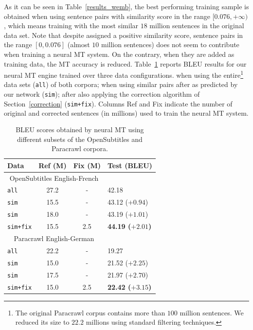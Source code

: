 \documentclass[11pt,a4paper]{article}
\begin{document}
As it can be seen in Table~\ref{results_wemb}, the best performing
training sample is obtained when using sentence pairs with similarity
score in the range $[0.076, +\infty)$, which means training with the 
most similar $18$ million sentences in the original data set. 
Note that despite assigned a positive similarity score, sentence pairs in the range $[0, 0.076]$ (almost $10$ million sentences) does not seem to contribute when training a neural MT system. 
On the contrary, when they are added as training data, the MT accuracy is reduced.
Table~\ref{results} reports BLEU results for our neural MT engine trained over three data configurations.
when using the entire\footnote{The original Paracrawl corpus contains more than $100$ million sentences. We reduced its size to $22.2$ millions using standard filtering techniques.} data sets (\texttt{all}) of both corpora; 
when using similar pairs after as predicted by our network (\texttt{sim}); 
after also applying the correction algorithm of Section~\ref{correction} (\texttt{sim+fix}).
Columns Ref and Fix indicate the number of original and corrected
sentences (in millions) used to train the neural MT system.

\begin{table}[h!]
\small
\center
\begin{tabular}{lccl}
\hline
\bf Data & \bf Ref (M) & \bf Fix (M) & \bf Test (BLEU) \\ %
\hline
\multicolumn{3}{c}{\scriptsize{OpenSubtitles English-French}} \\
\texttt{all}                   & 27.2 & - & 42.18 \\
\texttt{sim}            & 15.5 & - & 43.12  ($+0.94$)\\
\texttt{sim}           & 18.0 & - & 43.19  ($+1.01$)\\
\texttt{sim+fix}     & 15.5 & 2.5 & \bf 44.19 ($+2.01$)\\
\hline
\multicolumn{3}{c}{\scriptsize{Paracrawl English-German}} \\
\texttt{all}                  & 22.2 & - & 19.27 \\ 
\texttt{sim}           & 15.0 & - & 21.52 ($+2.25$)\\
\texttt{sim}           & 17.5 & - & 21.97 ($+2.70$)\\
\texttt{sim+fix}   & 15.0 & 2.5 & \bf 22.42 ($+3.15$) \\
\hline
\end{tabular}
\caption{BLEU scores obtained by neural MT using different subsets of the OpenSubtitles and Paracrawl corpora.}
\label{results}
\end{table}
\end{document}
